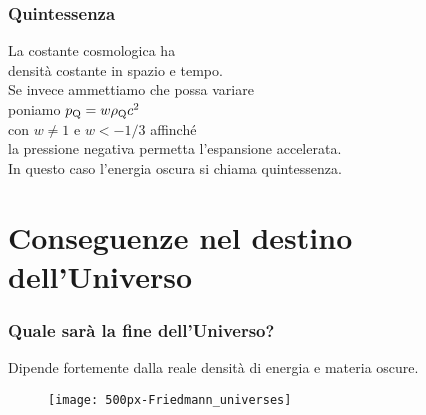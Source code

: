 
\begin{frame}
  \frametitle{Quintessenza}
  La costante cosmologica ha \\
  densità costante in spazio e tempo. \\
  Se invece ammettiamo che possa variare \\
  poniamo $p_{\textup{Q}} = w\rho_{\textup{Q}}c^2$ \\
  con $w \neq 1$ e $w < -1/3$ affinché \\
  la pressione negativa permetta l'espansione accelerata. \\
  In questo caso l'energia oscura si chiama \alert{quintessenza}.
\end{frame}

\section[Conseguenze]{Conseguenze nel destino dell'Universo}

\begin{frame}
  \frametitle{Quale sarà la fine dell'Universo?}
  Dipende fortemente dalla reale densità di energia e materia oscure.
  \begin{figure}
    \centering
    \texttt{[image: 500px-Friedmann\_universes]}
  \end{figure}
\end{frame}

